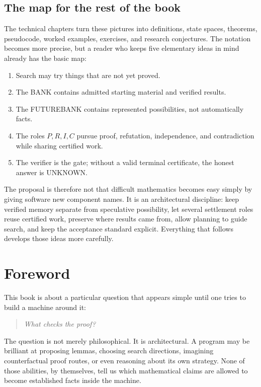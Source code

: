 \documentclass[11pt,openany]{book}
\theoremstyle{definition}
\theoremstyle{remark}
\begin{document}
\section*{The map for the rest of the book}
The technical chapters turn these pictures into definitions, state spaces, theorems, pseudocode, worked examples, exercises, and research conjectures. The notation becomes more precise, but a reader who keeps five elementary ideas in mind already has the basic map:
\begin{enumerate}
\item Search may try things that are not yet proved.
\item The BANK contains admitted starting material and verified results.
\item The FUTUREBANK contains represented possibilities, not automatically facts.
\item The roles $P,R,I,C$ pursue proof, refutation, independence, and contradiction while sharing certified work.
\item The verifier is the gate; without a valid terminal certificate, the honest answer is \textsf{UNKNOWN}.
\end{enumerate}

The proposal is therefore not that difficult mathematics becomes easy simply by giving software new component names. It is an architectural discipline: keep verified memory separate from speculative possibility, let several settlement roles reuse certified work, preserve where results came from, allow planning to guide search, and keep the acceptance standard explicit. Everything that follows develops those ideas more carefully.

\clearpage

\chapter*{Foreword}
This book is about a particular question that appears simple until one tries to build a machine around it:
\begin{quote}
\emph{What checks the proof?}
\end{quote}
The question is not merely philosophical. It is architectural. A program may be brilliant at proposing lemmas, choosing search directions, imagining counterfactual proof routes, or even reasoning about its own strategy. None of those abilities, by themselves, tell us which mathematical claims are allowed to become established facts inside the machine.
\end{document}
